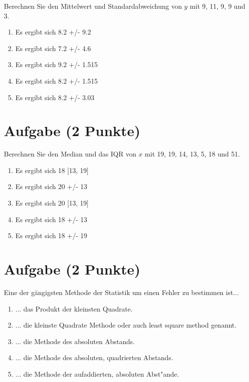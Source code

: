 \documentclass[a4paper, 10pt]{scrartcl}\usepackage[]{graphicx}\usepackage[]{xcolor}
\begin{document}
Berechnen Sie den Mittelwert und Standardabweichung von $y$ mit 9, 11, 9, 9 und 3.



\begin{enumerate}
\item [\textbf{A} \msquare] Es ergibt sich 8.2 +/- 9.2
\item [\textbf{B} \msquare] Es ergibt sich 7.2 +/- 4.6
\item [\textbf{C} \msquare] Es ergibt sich 9.2 +/- 1.515
\item [\textbf{D} \msquare] Es ergibt sich 8.2 +/- 1.515
\item [\textbf{E} \msquare] Es ergibt sich 8.2 +/- 3.03
\end{enumerate} 

\section{Aufgabe \hfill (2 Punkte)}




Berechnen Sie den Median und das IQR von $x$ mit 19, 19, 14, 13, 5, 18 und 51.



\begin{enumerate}
\item [\textbf{A} \msquare] Es ergibt sich 18 [13, 19]
\item [\textbf{B} \msquare] Es ergibt sich 20 +/- 13
\item [\textbf{C} \msquare] Es ergibt sich 20 [13, 19]
\item [\textbf{D} \msquare] Es ergibt sich 18 +/- 13
\item [\textbf{E} \msquare] Es ergibt sich 18 +/- 19
\end{enumerate}

\section{Aufgabe \hfill (2 Punkte)}

Eine der g{\"a}ngigsten Methode der Statistik um einen Fehler zu bestimmen ist...



\begin{enumerate}
\item [\textbf{A} \msquare] ... das Produkt der kleinsten Quadrate.
\item [\textbf{B} \msquare] ... die kleinste Quadrate Methode oder auch least square method genannt.
\item [\textbf{C} \msquare] ... die Methode des absoluten Abstands.
\item [\textbf{D} \msquare] ... die Methode des absoluten, quadrierten Abstands.
\item [\textbf{E} \msquare] ... die Methode der aufaddierten, absoluten Abst{"a}nde.
\end{enumerate} 
\end{document}
